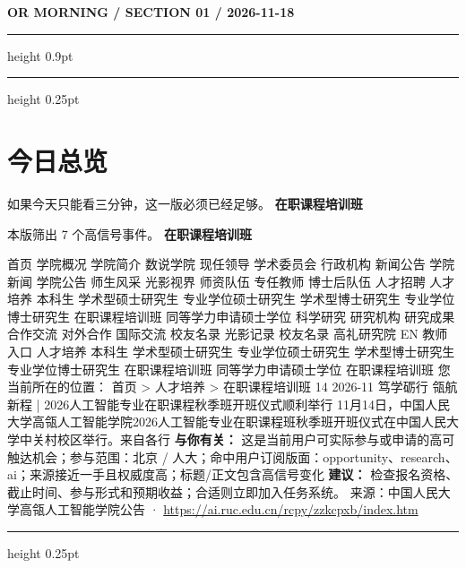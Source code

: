 \documentclass[10.5pt]{ctexart}
\begin{document}
{\small\bfseries OR MORNING / SECTION 01 / 2026-11-18}
\vspace{2mm}
\hrule height 0.9pt
\vspace{1.5mm}
\hrule height 0.25pt
\vspace{4mm}
\section*{今日总览}
{\color{ormuted} 如果今天只能看三分钟，这一版必须已经足够。}
\vspace{2mm}
{\fontsize{25}{29}\selectfont\bfseries 在职课程培训班}\par
\vspace{2mm}
{\large 本版筛出 7 个高信号事件。}
\vspace{3mm}
{\Large\bfseries 在职课程培训班}\par
首页 学院概况 学院简介 数说学院 现任领导 学术委员会 行政机构 新闻公告 学院新闻 学院公告 师生风采 光影视界 师资队伍 专任教师 博士后队伍 人才招聘 人才培养 本科生 学术型硕士研究生 专业学位硕士研究生 学术型博士研究生 专业学位博士研究生 在职课程培训班 同等学力申请硕士学位 科学研究 研究机构 研究成果 合作交流 对外合作 国际交流 校友名录 光影记录 校友名录 高礼研究院 EN 教师入口 人才培养 本科生 学术型硕士研究生 专业学位硕士研究生 学术型博士研究生 专业学位博士研究生 在职课程培训班 同等学力申请硕士学位 在职课程培训班 您当前所在的位置： 首页 > 人才培养 > 在职课程培训班 14 2026-11 笃学砺行 瓴航新程 | 2026人工智能专业在职课程秋季班开班仪式顺利举行 11月14日，中国人民大学高瓴人工智能学院2026人工智能专业在职课程班秋季班开班仪式在中国人民大学中关村校区举行。来自各行
\textbf{与你有关：} 这是当前用户可实际参与或申请的高可触达机会；参与范围：北京 / 人大；命中用户订阅版面：opportunity、research、ai；来源接近一手且权威度高；标题/正文包含高信号变化
\textbf{建议：} 检查报名资格、截止时间、参与形式和预期收益；合适则立即加入任务系统。
{\footnotesize\color{ormuted} 来源：中国人民大学高瓴人工智能学院公告 · \url{https://ai.ruc.edu.cn/rcpy/zzkcpxb/index.htm}}
\vspace{3mm}
\hrule height 0.25pt
\vspace{3mm}
\end{document}
